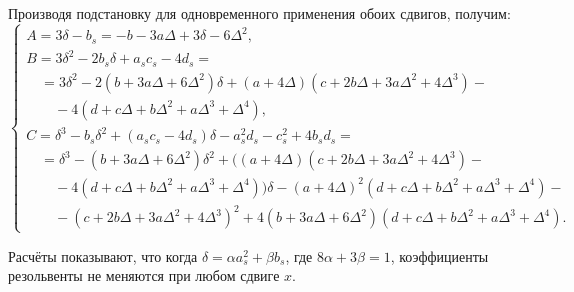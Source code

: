 ﻿\documentclass[fleqn]{article}
\begin{document}
\date{}

\maketitle

Производя подстановку для одновременного применения обоих сдвигов, получим:
\begin{equation}
\begin{cases}
A = 3\delta - b_s = -b - 3a\Delta +3\delta - 6\Delta^2, & \\
B = 3\delta^2 - 2b_s \delta + a_s c_s - 4d_s = \\
\quad = 3\delta^2 - 2(b + 3a\Delta + 6\Delta ^2)\delta + (a + 4\Delta) (c + 2b\Delta + 3a\Delta ^2 + 4\Delta ^3)- \\
\qquad - 4(d + c\Delta + b\Delta ^2 + a\Delta ^3 + \Delta ^4), \\
C = \delta ^3 - b_s \delta ^2 + (a_s c_s - 4d_s )\delta  - a_s^2 d_s - c_s^2 + 4b_s d_s = \\
\quad = \delta ^3 - (b + 3a\Delta + 6\Delta ^2)\delta ^2 + ((a + 4\Delta )(c + 2b\Delta + 3a\Delta ^2 + 4\Delta ^3) - \\
\qquad - 4(d + c\Delta + b\Delta ^2 + a\Delta ^3 + \Delta ^4))\delta - (a + 4\Delta )^2 (d + c\Delta  + b\Delta ^2 + a\Delta ^3 + \Delta ^4) - \\
\qquad - (c + 2b\Delta + 3a\Delta ^2 + 4\Delta ^3)^2 + 4(b + 3a\Delta + 6\Delta ^2)(d + c\Delta + b\Delta ^2 + a\Delta ^3 + \Delta ^4).
\end{cases}
\end{equation}

Расчёты показывают, что когда $\delta  = \alpha a_s^2 + \beta b_s $, где $8\alpha + 3\beta  = 1$, коэффициенты резольвенты
не меняются при любом сдвиге $x$.
\end{document}
